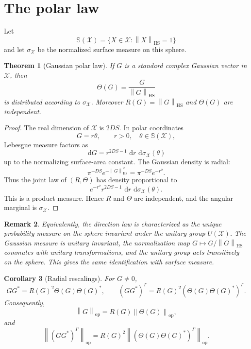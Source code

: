 \documentclass[11pt,oneside]{book}
\newtheorem{theorem}{Theorem}[chapter]
\newtheorem{corollary}[theorem]{Corollary}
\newtheorem{remark}[theorem]{Remark}
\newcommand{\1}{\mathbf 1}
\newcommand{\GammaPT}{\Gamma}
\newcommand{\HS}{\mathrm{HS}}
\newcommand{\op}{\mathrm{op}}
\newcommand{\dd}{\,\mathrm d}
\newcommand{\sphere}{\mathbb S}
\newcommand{\norm}[1]{\left\|#1\right\|}
\begin{document}
\section{The polar law}

Let
\[
  \sphere(\mathcal X)=\{X\in\mathcal X:\norm X_{\HS}=1\}
\]
and let \(\sigma_{\mathcal X}\) be the normalized surface measure on this
sphere.

\begin{theorem}[Gaussian polar law]
If \(G\) is a standard complex Gaussian vector in \(\mathcal X\), then
\[
  \Theta(G)=\frac{G}{\norm G_{\HS}}
\]
is distributed according to \(\sigma_{\mathcal X}\).  Moreover
\(R(G)=\norm G_{\HS}\) and \(\Theta(G)\) are independent.
\end{theorem}

\begin{proof}
The real dimension of \(\mathcal X\) is \(2DS\).  In polar coordinates
\[
  G=r\theta,\qquad r>0,\quad \theta\in\sphere(\mathcal X),
\]
Lebesgue measure factors as
\[
  \dd G=r^{2DS-1}\,\dd r\,\dd\sigma_{\mathcal X}(\theta)
\]
up to the normalizing surface-area constant.  The Gaussian density is radial:
\[
  \pi^{-DS}e^{-\norm G_{\HS}^2}
  =
  \pi^{-DS}e^{-r^2}.
\]
Thus the joint law of \((R,\Theta)\) has density proportional to
\[
  e^{-r^2}r^{2DS-1}\,\dd r\,\dd\sigma_{\mathcal X}(\theta).
\]
This is a product measure.  Hence \(R\) and \(\Theta\) are independent, and
the angular marginal is \(\sigma_{\mathcal X}\).
\end{proof}

\begin{remark}
Equivalently, the direction law is characterized as the unique probability
measure on the sphere invariant under the unitary group \(U(\mathcal X)\).
The Gaussian measure is unitary invariant, the normalization map
\(G\mapsto G/\norm G_{\HS}\) commutes with unitary transformations, and the
unitary group acts transitively on the sphere.  This gives the same
identification with surface measure.
\end{remark}

\begin{corollary}[Radial rescalings]
For \(G\ne0\),
\[
  GG^*=R(G)^2\Theta(G)\Theta(G)^*,
  \qquad
  (GG^*)^{\GammaPT}
  =
  R(G)^2(\Theta(G)\Theta(G)^*)^{\GammaPT}.
\]
Consequently,
\[
  \norm G_{\op}=R(G)\norm{\Theta(G)}_{\op},
\]
and
\[
  \norm{(GG^*)^{\GammaPT}}_{\op}
  =
  R(G)^2\norm{(\Theta(G)\Theta(G)^*)^{\GammaPT}}_{\op}.
\]
\end{corollary}
\end{document}
